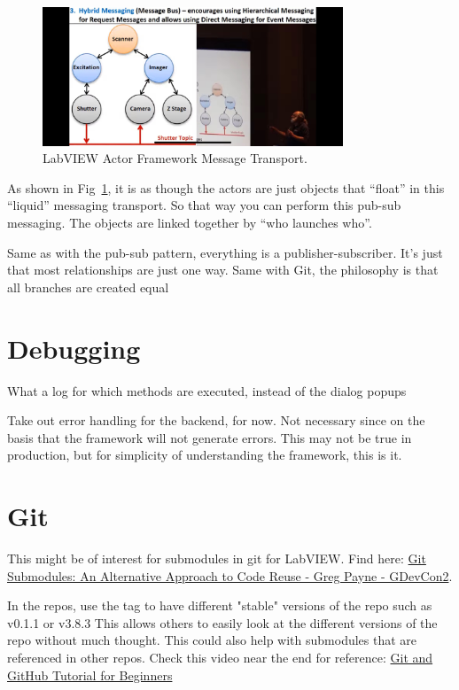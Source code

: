 \documentclass{article}
\begin{document}
\begin{figure}[!ht]
    \centering
    \includegraphics[width=0.8\textwidth]{figures/labview_dmitry_message _transport}
    \caption{LabVIEW Actor Framework Message Transport.}
    \label{fig:message-transport}
\end{figure}

As shown in Fig~\ref{fig:message-transport}, it is as though the actors are just objects that “float” in this “liquid” messaging transport.
So that way you can perform this pub-sub messaging.
The objects are linked together by “who launches who”.

Same as with the pub-sub pattern, everything is a publisher-subscriber.
It's just that most relationships are just one way.
Same with Git, the philosophy is that all branches are created equal

\section{Debugging}
\label{sec:debugging}

What a log for which methods are executed, instead of the dialog popups

Take out error handling for the backend, for now.
Not necessary since on the basis that the framework will not generate errors.
This may not be true in production, but for simplicity of understanding the framework, this is it.


\section{Git}
\label{sec:git}

This might be of interest for submodules in git for LabVIEW.
Find here: \href{https://www.youtube.com/watch?v=iv7WwDgyb0U}{Git Submodules: An Alternative Approach to Code Reuse - Greg Payne - GDevCon2}.

In the repos, use the tag to have different "stable" versions of the repo such as v0.1.1 or v3.8.3
This allows others to easily look at the different versions of the repo without much thought.
This could also help with submodules that are referenced in other repos.
Check this video near the end for reference: \href{https://www.youtube.com/watch?v=tRZGeaHPoaw&list=PLvDxiIkwuMQs0Uu6AIhTGqXahndMmfUyx&index=19}{Git and GitHub Tutorial for Beginners}
\end{document}
